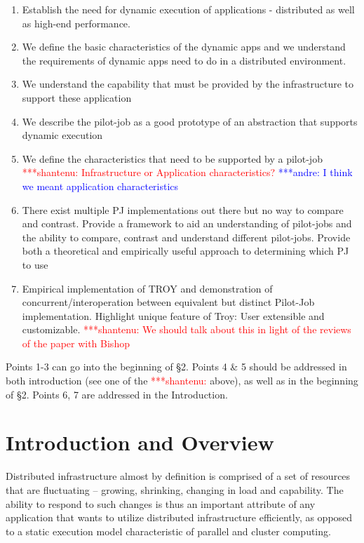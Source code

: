 \documentclass[conference,final]{IEEEtran}
\newcommand{\jhanote}[1]{ {\textcolor{red} { ***shantenu: #1 }}}
\newcommand{\alnote}[1]{ {\textcolor{blue} { ***andre: #1 }}}
\newcommand{\alnote}[1]{}
\newcommand{\jhanote}[1]{}
\begin{document}
\begin{enumerate}

\item Establish the need for dynamic execution of applications -
  distributed as well as high-end performance.

\item We define the basic characteristics of the dynamic apps and we
  understand the requirements of dynamic apps need to do in a
  distributed environment.

\item We understand the capability that must be provided by the
  infrastructure to support these application

\item We describe the pilot-job as a good prototype of an abstraction
  that supports dynamic execution

\item We define the characteristics that need to be supported by a
  pilot-job \jhanote{Infrastructure or Application characteristics?}
  \alnote{I think we meant application characteristics}

\item There exist multiple PJ implementations out there but no way to
  compare and contrast. Provide a framework to aid an understanding of
  pilot-jobs and the ability to compare, contrast and understand
  different pilot-jobs.  Provide both a theoretical and empirically
  useful approach to determining which PJ to use

\item Empirical implementation of TROY and demonstration of
  concurrent/interoperation between equivalent but distinct Pilot-Job
  implementation. Highlight unique feature of Troy: User extensible
  and customizable. \jhanote{We should talk about this in light of the
    reviews of the paper with Bishop}
\end{enumerate}

Points 1-3 can go into the beginning of \S 2.  Points 4 \& 5 should be
addressed in both introduction (see one of the \jhanote{} above), as
well as in the beginning of \S 2. Points 6, 7 are addressed in the
Introduction.

\section{Introduction and Overview}


Distributed infrastructure almost by definition is comprised of a set
of resources that are fluctuating -- growing, shrinking, changing in
load and capability.  The ability to respond to such changes is thus
an important attribute of any application that wants to utilize
distributed infrastructure efficiently, as opposed to a static
execution model characteristic of parallel and cluster computing.
\end{document}
